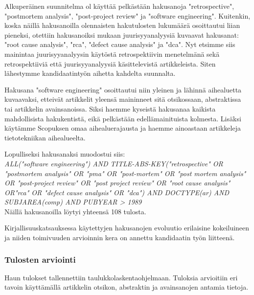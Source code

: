 Alkuperäinen suunnitelma ol käyttää pelkästään hakusanoja "retrospective",  "postmortem analysis", "post-project review" ja "software engineering". Kuitenkin, koska näillä hakusanoilla olennaisten hakutulosten lukumäärä osoittautui liian pieneksi, otettiin hakusanoiksi mukaan juurisyyanalyysiä kuvaavat hakusanat: "root cause analysis", "rca", "defect cause analysis" ja "dca". Nyt etsimme siis mainintaa juurisyyanalyysin käytöstä retrospektiivin menetelmänä sekä retrospektiiviä että juurisyyanalyysiä käsittelevistä artikkeleista. Siten lähestymme kandidaatintyön aihetta kahdelta suunnalta.

Hakusana "software engineering" osoittautui niin yleinen ja lähinnä aihealuetta kuvaavaksi, etteivät artikkelit yleensä maininneet sitä otsikossaan, abstraktissa tai artikkelin avainsanoissa. Siksi haemme kyseistä hakusanaa kaikista mahdollisista hakukentistä, eikä pelkästään edellämainituista kolmesta. Lisäksi käytämme Scopuksen omaa aihealuerajausta ja haemme ainoastaan artikkeleja tietotekniikan aihealueelta.

Lopulliseksi hakusanaksi muodostui siis:\\
\textit{ALL("software engineering") AND TITLE-ABS-KEY("retrospective" OR "postmortem analysis" OR "pma" OR "post-mortem" OR "post mortem analysis" OR "post-project review" OR "post project review" OR "root cause analysis" OR"rca" OR "defect cause analysis" OR "dca") AND DOCTYPE(ar) AND SUBJAREA(comp) AND PUBYEAR > 1989}\\
Näillä hakusanoilla löytyi yhteensä 108 tulosta.

Kirjallisuuskatsauksessa käytettyjen hakusanojen evoluutio erilaisine kokeiluineen ja niiden toimivuuden arvioinnin kera on annettu kandidaatin työn liitteenä.

\subsubsection{Tulosten arviointi}
Haun tulokset tallennettiin taulukkolaskentaohjelmaan. Tuloksia arvioitiin eri tavoin käyttämällä artikkelin otsikon, abstraktin ja avainsanojen antamia tietoja.
\clearpage

